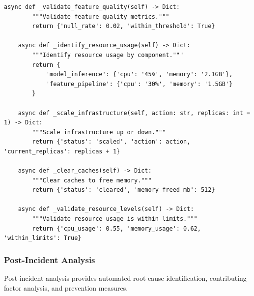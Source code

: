 \begin{lstlisting}[style=python, caption={Runbook automation with guided remediation}]
    async def _validate_feature_quality(self) -> Dict:
        """Validate feature quality metrics."""
        return {'null_rate': 0.02, 'within_threshold': True}

    async def _identify_resource_usage(self) -> Dict:
        """Identify resource usage by component."""
        return {
            'model_inference': {'cpu': '45%', 'memory': '2.1GB'},
            'feature_pipeline': {'cpu': '30%', 'memory': '1.5GB'}
        }

    async def _scale_infrastructure(self, action: str, replicas: int = 1) -> Dict:
        """Scale infrastructure up or down."""
        return {'status': 'scaled', 'action': action, 'current_replicas': replicas + 1}

    async def _clear_caches(self) -> Dict:
        """Clear caches to free memory."""
        return {'status': 'cleared', 'memory_freed_mb': 512}

    async def _validate_resource_levels(self) -> Dict:
        """Validate resource usage is within limits."""
        return {'cpu_usage': 0.55, 'memory_usage': 0.62, 'within_limits': True}
\end{lstlisting}

\subsubsection{Post-Incident Analysis}

Post-incident analysis provides automated root cause identification, contributing factor analysis, and prevention measures.

